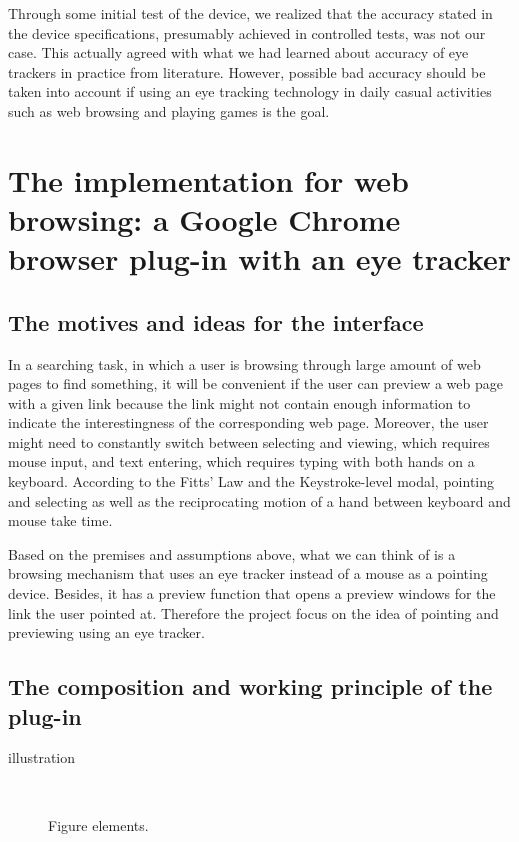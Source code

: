 \documentclass[english]{tktltiki}
\begin{document}
Through some initial test of the device, we realized that the accuracy stated in the device specifications, presumably achieved in controlled tests, was not our case. This actually agreed with what we had learned about accuracy of eye trackers in practice from literature. \cite{majaranta14} However, possible bad accuracy should be taken into account if using an eye tracking technology in daily casual activities such as web browsing and playing games is the goal. 


\section{The implementation for web browsing: a Google Chrome browser plug-in with an eye tracker}


\subsection{The motives and ideas for the interface}  

In a searching task, in which a user is browsing through large amount of web pages to find something, it will be convenient if the user can preview a web page with a given link because the link might not contain enough information to indicate the interestingness of the corresponding web page. Moreover, the user might need to constantly switch between selecting and viewing, which requires mouse input, and text entering, which requires typing with both hands on a keyboard. According to the Fitts' Law and the Keystroke-level modal,\cite{Fitts64}\cite{Card:1980:KMU:358886.358895} pointing and selecting as well as the reciprocating motion of a hand between keyboard and mouse take time. 

Based on the premises and assumptions above, what we can think of is a browsing mechanism that uses an eye tracker instead of a mouse as a pointing device. Besides, it has a preview function that opens a preview windows for the link the user pointed at. Therefore the project focus on the idea of pointing and previewing using an eye tracker.  



\subsection{The composition and working principle of the plug-in}

{illustration}
\begin{figure}[h]
\ \newline
\begin{center}
\caption{Figure elements.}
\label{kuvaesimerkki}
\end{center}
\end{figure}
\end{document}

